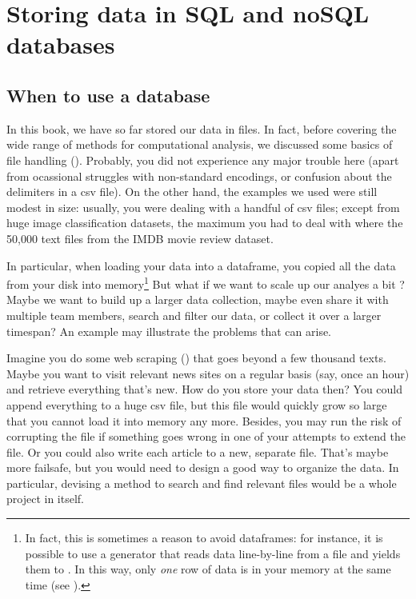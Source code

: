 \section{Storing data in SQL and noSQL databases}
\label{sec:databases}

\subsection{When to use a database}
In this book, we have so far stored our data in files. In fact, before
covering the wide range of methods for computational analysis, we
discussed some basics of file handling
(). Probably, you did not experience any major
trouble here (apart from ocassional struggles with non-standard
encodings, or confusion about the delimiters in a csv file). On the
other hand, the examples we used were still modest in size: usually,
you were dealing with a handful of csv files; except from huge image classification datasets, the maximum you had to
deal with where the 50,000 text files from the IMDB movie review
dataset.

In particular, when loading your data into a dataframe, you copied all
the data from your disk into memory\footnote{In fact, this is
  sometimes a reason to avoid dataframes: for instance, it is possible
  to use a generator that reads data line-by-line from a file and
  yields them to . In this way, only \emph{one} row
  of data is in your memory at the same time (see ).}
But what if we want to scale up our analyes a bit
\cite[see][]{Trilling2018b}? Maybe we want to build up a larger
data collection, maybe even share it with multiple team members, search
and filter our data, or collect it over a larger timespan? An
example may illustrate the problems that can arise.

Imagine you do some web scraping () that goes beyond
a few thousand texts. Maybe you want to visit relevant news sites on a
regular basis (say, once an hour) and retrieve everything that's
new. How do you store your data then? You could append everything to a
huge csv file, but this file would quickly grow so large that you
cannot load it into memory any more. Besides, you may run the risk of
corrupting the file if something goes wrong in one of your attempts to
extend the file. Or you could also write each article to a new, separate file.
That's maybe more failsafe, but you would need to design a good way
to organize the data. In particular, devising a method to search
and find relevant files would be a whole project in itself.

